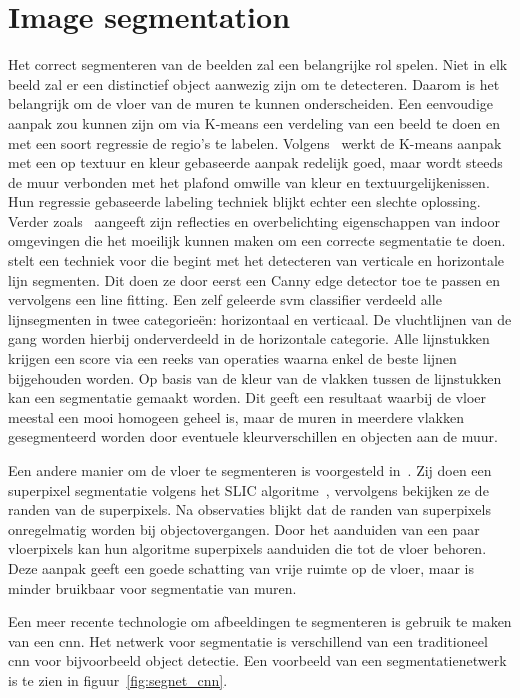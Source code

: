     \section{Image segmentation}\label{sec:image_segmentation}
        Het correct segmenteren van de beelden zal een belangrijke rol spelen. Niet in elk beeld zal er een distinctief object aanwezig zijn om te detecteren. Daarom is het belangrijk om de vloer van
        de muren te kunnen onderscheiden. Een eenvoudige aanpak zou kunnen zijn om via K-means een verdeling van een beeld te doen en met een soort regressie de regio's te labelen. 
        Volgens~\cite{zhangwall} werkt de K-means aanpak met een op textuur en kleur gebaseerde aanpak redelijk goed, maar wordt steeds de muur verbonden met het plafond omwille van kleur en textuurgelijkenissen.
        Hun regressie gebaseerde labeling techniek blijkt echter een slechte oplossing. Verder zoals~\cite{Li2010} aangeeft zijn reflecties en overbelichting eigenschappen van indoor omgevingen die het moeilijk kunnen maken om
        een correcte segmentatie te doen.
        \cite{Li2010} stelt een techniek voor die begint met het detecteren van verticale en horizontale lijn segmenten. Dit doen ze door eerst een Canny edge detector\cite{Canny} toe te passen en vervolgens een line fitting.
        Een zelf geleerde \gls{svm} classifier verdeeld alle lijnsegmenten in twee categorie\"{e}n: horizontaal en verticaal. De vluchtlijnen van de gang worden hierbij onderverdeeld in de horizontale categorie.
        Alle lijnstukken krijgen een score via een reeks van operaties waarna enkel de beste lijnen bijgehouden worden. Op basis van de kleur van de vlakken tussen de lijnstukken kan een segmentatie gemaakt worden.
        Dit geeft een resultaat waarbij de vloer meestal een mooi homogeen geheel is, maar de muren in meerdere vlakken gesegmenteerd worden door eventuele kleurverschillen en objecten aan de muur.
        
        Een andere manier om de vloer te segmenteren is voorgesteld in~\cite{Rodriguez-Telles2013}. Zij doen een superpixel segmentatie volgens het SLIC algoritme~\cite{slic}, vervolgens bekijken ze de randen van de superpixels.
        Na observaties blijkt dat de randen van superpixels onregelmatig worden bij objectovergangen. Door het aanduiden van een paar vloerpixels kan hun algoritme superpixels aanduiden die tot de vloer behoren.
        Deze aanpak geeft een goede schatting van vrije ruimte op de vloer, maar is minder bruikbaar voor segmentatie van muren.

        Een meer recente technologie om afbeeldingen te segmenteren is gebruik te maken van een \gls{cnn}. Het netwerk voor segmentatie is verschillend van een traditioneel \gls{cnn} voor bijvoorbeeld object detectie.
        Een voorbeeld van een segmentatienetwerk is te zien in figuur~\ref{fig:segnet_cnn}.

